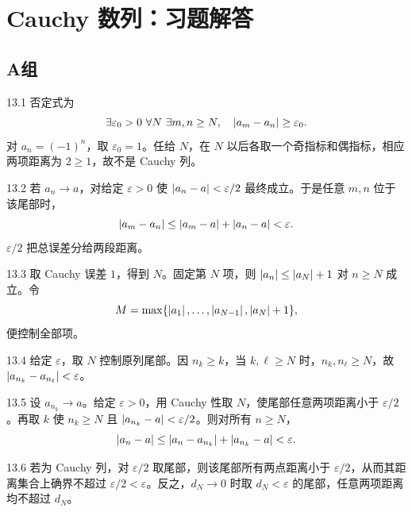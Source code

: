 \chapter{Cauchy 数列：习题解答}

\section*{A组}

\begin{solution}{13.1}
否定式为
\[
 \exists\varepsilon_0>0\ \forall N\ \exists m,n\ge N,\quad
 \left|a_m-a_n\right|\ge\varepsilon_0.
\]
对 \(a_n=(-1)^n\)，取 \(\varepsilon_0=1\)。任给 \(N\)，在 \(N\) 以后各取一个奇指标和偶指标，相应两项距离为 \(2\ge1\)，故不是 Cauchy 列。
\end{solution}

\begin{solution}{13.2}
若 \(a_n\to a\)，对给定 \(\varepsilon>0\) 使
\(\left|a_n-a\right|<\varepsilon/2\) 最终成立。于是任意 \(m,n\) 位于该尾部时，
\[
 \left|a_m-a_n\right|\le\left|a_m-a\right|+\left|a_n-a\right|<\varepsilon.
\]
\(\varepsilon/2\) 把总误差分给两段距离。
\end{solution}

\begin{solution}{13.3}
取 Cauchy 误差 \(1\)，得到 \(N\)。固定第 \(N\) 项，则
\(\left|a_n\right|\le\left|a_N\right|+1\) 对 \(n\ge N\) 成立。令
\[
 M=\max\{\left|a_1\right|,\ldots,\left|a_{N-1}\right|,\left|a_N\right|+1\},
\]
便控制全部项。
\end{solution}

\begin{solution}{13.4}
给定 \(\varepsilon\)，取 \(N\) 控制原列尾部。因 \(n_k\ge k\)，当
\(k,\ell\ge N\) 时，\(n_k,n_\ell\ge N\)，故
\(\left|a_{n_k}-a_{n_\ell}\right|<\varepsilon\)。
\end{solution}

\begin{solution}{13.5}
设 \(a_{n_k}\to a\)。给定 \(\varepsilon>0\)，用 Cauchy 性取 \(N\)，使尾部任意两项距离小于 \(\varepsilon/2\)。再取 \(k\) 使
\(n_k\ge N\) 且 \(\left|a_{n_k}-a\right|<\varepsilon/2\)。则对所有 \(n\ge N\)，
\[
 \left|a_n-a\right|\le\left|a_n-a_{n_k}\right|+\left|a_{n_k}-a\right|<\varepsilon.
\]
\end{solution}

\begin{solution}{13.6}
若为 Cauchy 列，对 \(\varepsilon/2\) 取尾部，则该尾部所有两点距离小于 \(\varepsilon/2\)，从而其距离集合上确界不超过 \(\varepsilon/2<\varepsilon\)。反之，\(d_N\to0\) 时取 \(d_N<\varepsilon\) 的尾部，任意两项距离均不超过 \(d_N\)。
\end{solution}

